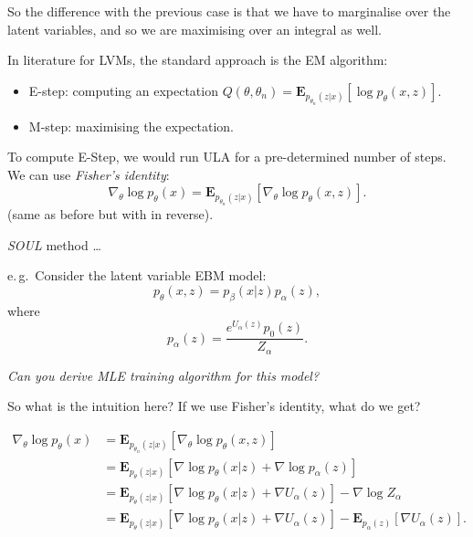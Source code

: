 \documentclass{article}
\begin{document}
    So the difference with the previous case is that we have to marginalise over the latent variables, and so we are maximising over an integral as well.

    In literature for LVMs, the standard approach is the EM algorithm:
    \begin{itemize}
        \item E-step: computing an expectation $Q(\theta, \theta_n) = \mathbf{E}_{p_{\theta_n}(z|x)} \left[ \log p_\theta(x,z) \right]$.
        \item M-step: maximising the expectation.
    \end{itemize}
    To compute E-Step, we would run ULA for a pre-determined number of steps.
    We can use \textit{Fisher's identity}:
    \begin{equation} \label{eq:}
      \nabla_\theta \log p_\theta(x) = \mathbf{E}_{p_{\theta_n}(z|x)} \left[ \nabla_\theta \log p_\theta(x,z) \right].
    \end{equation}
    (same as before but with  in reverse).

    \textit{SOUL} method \ldots 

    e.\,g.\ Consider the latent variable EBM model:
    \begin{equation} \label{eq:}
      p_\theta(x, z) = p_\beta(x|z) p_\alpha(z),
    \end{equation}
    where
    \begin{equation} \label{eq:}
        p_\alpha(z) = \frac{e^{U_\alpha(z)} p_0(z)}{Z_\alpha}.
    \end{equation}
    
    \textit{Can you derive MLE training algorithm for this model?}

    So what is the intuition here? 
    If we use Fisher's identity, what do we get?

    \begin{align} \label{eq:}
        \nabla_\theta \log p_\theta(x) &= \mathbf{E}_{p_{\theta_n}(z|x)} \left[ \nabla_\theta \log p_\theta(x,z) \right] \\
                                       &= \mathbf{E}_{p_\theta(z|x)}[\nabla \log p_\theta(x|z) + \nabla \log p_\alpha(z)] \\
                                       &= \mathbf{E}_{p_\theta(z|x)}[\nabla \log p_\theta(x|z) + \nabla U_\alpha(z)]  - \nabla \log Z_\alpha \\
                                       &= \mathbf{E}_{p_\theta(z|x)}[\nabla \log p_\theta(x|z) + \nabla U_\alpha(z)]  - \mathbf{E}_{p_\alpha(z)}[\nabla U_\alpha(z)].
    \end{align}
    
\end{document}
